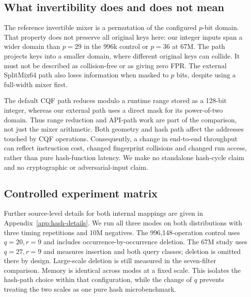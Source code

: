\subsection{What invertibility does and does not mean}
The reference invertible mixer is a permutation of the configured $p$-bit domain. That property does not preserve all original keys here: our integer inputs span a wider domain than $p=29$ in the 996k control or $p=36$ at 67M. The path projects keys into a smaller domain, where different original keys can collide. It must not be described as collision-free or as giving zero FPR. The external SplitMix64 path also loses information when masked to $p$ bits, despite using a full-width mixer first.

The default CQF path reduces modulo a runtime range stored as a 128-bit integer, whereas our external path uses a direct mask for its power-of-two domain. Thus range reduction and API-path work are part of the comparison, not just the mixer arithmetic. Both geometry and hash path affect the addresses touched by CQF operations. Consequently, a change in end-to-end throughput can reflect instruction cost, changed fingerprint collisions and changed run access, rather than pure hash-function latency. We make no standalone hash-cycle claim and no cryptographic or adversarial-input claim.

\subsection{Controlled experiment matrix}
Further source-level details for both internal mappings are given in Appendix~\ref{app:hash-details}. We run all three modes on both distributions with three timing repetitions and 10M negatives. The 996,148-operation control uses $q=20,r=9$ and includes occurrence-by-occurrence deletion. The 67M study uses $q=27,r=9$ and measures insertion and both query classes; deletion is omitted there by design. Large-scale deletion is still measured in the seven-filter comparison. Memory is identical across modes at a fixed scale. This isolates the hash-path choice within that configuration, while the change of $q$ prevents treating the two scales as one pure hash microbenchmark.
\clearpage
